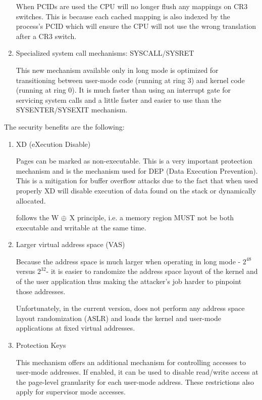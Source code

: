 \begin{appendices}
\begin{enumerate}
	When PCIDs are used the CPU will no longer flush any mappings on CR3 switches. This is because
each cached mapping is also indexed by the process's PCID which will ensure the CPU will not use
the wrong translation after a CR3 switch.

	\item Specialized system call mechanisms: SYSCALL/SYSRET

	This new mechanism available only in long mode is optimized for transitioning between user-mode
code (running at ring 3) and kernel code (running at ring 0). It is much faster than using an
interrupt gate for servicing system calls and a little faster and easier to use than the
SYSENTER/SYSEXIT mechanism.

\end{enumerate}

The security benefits are the following:
\begin{enumerate}
	\item XD (eXecution Disable)

	Pages can be marked as non-executable. This is a very important protection mechanism and is the
mechanism used for DEP (Data Execution Prevention). This is a mitigation for buffer overflow attacks
due to the fact that when used properly XD will disable execution of data found on the stack or
dynamically allocated.

	\projectname follows the W $\mathbin{\oplus}$ X principle, i.e. a memory region MUST not be both executable
and writable at the same time.

	\item Larger virtual address space (VAS)

	Because the address space is much larger when operating in long mode - \begin{math}2^{48}\end{math}
versus \begin{math}2^{32}\end{math}-  it is easier to randomize the address space layout of the
kernel and of the user application thus making the attacker's job harder to pinpoint those addresses.

	Unfortunately, in the current version, \projectname does not perform any address space layout
randomization (ASLR) and loads the kernel and user-mode applications at fixed virtual addresses.

	\item Protection Keys

	This mechanism offers an additional mechanism for controlling accesses to user-mode addresses.
If enabled, it can be used to disable read/write access at the page-level granularity for each
user-mode address. These restrictions also apply for supervisor mode accesses.


\end{enumerate}
\end{appendices}
